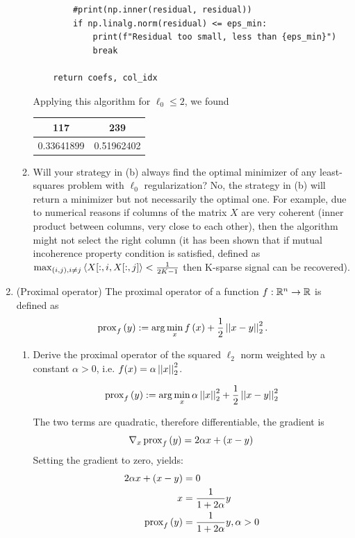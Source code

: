 \documentclass[12pt,twoside]{article}
\begin{document}
\begin{enumerate}
\begin{enumerate}
\begin{verbatim}
        #print(np.inner(residual, residual))
        if np.linalg.norm(residual) <= eps_min:
            print(f"Residual too small, less than {eps_min}")
            break
            
    return coefs, col_idx
\end{verbatim}
Applying this algorithm for  $\ell_0 \leq 2$, we found
    \begin{center}
    		\begin{tabular}{ | c | c |  }
    		\hline
			\text{column} 117 & \text{column} 239 \\
		\hline
			0.33641899 & 0.51962402 \\ 
		\hline
    	\end{tabular}
    \end{center}

    \item Will your strategy in (b) always find the optimal minimizer of any least-squares problem with $\ell_0$ regularization?
    No, the strategy in (b) will return a minimizer but not necessarily the optimal one. For example, due to numerical reasons if columns of the matrix $X$ are very coherent (inner product  between columns, very close to each other), then the algorithm might not select the right column (it has been shown that if mutual incoherence property condition is satisfied, defined  as $\max_{(i,j), i \neq j} \left \langle X[:,i, X[:,j]\right \rangle < \frac{1}{2K-1}$ then K-sparse signal can be recovered).
  \end{enumerate}
  
 \newpage
 \item (Proximal operator) The proximal operator of a function $f: \mathbb{R}^n \rightarrow \mathbb{R}$ is defined as
\begin{align}
\operatorname{prox}_{f}\left( y \right) := \arg \min_{x} f\left( x \right)+ \frac{1}{2} \left|\left| x-y \right|\right| _{2}^2.
\end{align}
  \begin{enumerate}
  \item Derive the proximal operator of the squared $\ell_2$ norm weighted by a constant $\alpha > 0$, i.e. $f(x)=\alpha \left|\left| x \right|\right| _{2}^2$.

\begin{align*}
\operatorname{prox}_{f}\left( y \right) := \arg \min_{x}  \alpha \left|\left| x \right|\right| _{2}^2 + \frac{1}{2} \left|\left| x-y \right|\right| _{2}^2
\end{align*}

The two terms are quadratic, therefore differentiable, the gradient is 
$$
	\nabla_x \operatorname{prox}_{f}\left( y \right) = 2 \alpha x + (x-y)
$$
 Setting the gradient to zero, yields:
\begin{align*}
	2 \alpha x + (x-y)			&= 	0 \\
		x 					&= \frac{1} {1+2 \alpha} y \\
		\operatorname{prox}_{f}\left( y \right) 		&=	 \frac{1} {1+2 \alpha} y, \alpha > 0 \\
\end{align*}
 

\end{enumerate}
\end{enumerate}
\end{document}
